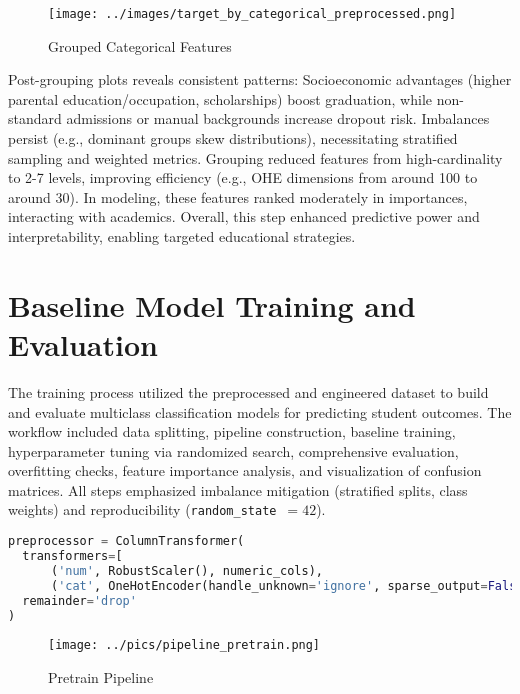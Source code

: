 \documentclass[twoside,final]{hcmut-report}
\begin{document}
\begin{figure}[H]
  \centering
  \texttt{[image: ../images/target\_by\_categorical\_preprocessed.png]}
  \caption{Grouped Categorical Features}
  \label{grouped_cat}
\end{figure}

Post-grouping plots reveals consistent patterns: Socioeconomic advantages (higher parental education/occupation, scholarships) boost graduation, while non-standard admissions or manual backgrounds increase dropout risk. Imbalances persist (e.g., dominant groups skew distributions), necessitating stratified sampling and weighted metrics. Grouping reduced features from high-cardinality to 2-7 levels, improving efficiency (e.g., OHE dimensions from around 100 to around 30). In modeling, these features ranked moderately in importances, interacting with academics. Overall, this step enhanced predictive power and interpretability, enabling targeted educational strategies.

\section{Baseline Model Training and Evaluation}
The training process utilized the preprocessed and engineered dataset to build and evaluate multiclass classification models for predicting student outcomes. The workflow included data splitting, pipeline construction, baseline training, hyperparameter tuning via randomized search, comprehensive evaluation, overfitting checks, feature importance analysis, and visualization of confusion matrices. All steps emphasized imbalance mitigation (stratified splits, class weights) and reproducibility (\texttt{random\_state}~$=42$).
\begin{lstlisting}[language=python]
preprocessor = ColumnTransformer(
  transformers=[
      ('num', RobustScaler(), numeric_cols),
      ('cat', OneHotEncoder(handle_unknown='ignore', sparse_output=False), categorical_cols)],
  remainder='drop'
)
\end{lstlisting}
\begin{figure}[H]
  \centering
  \texttt{[image: ../pics/pipeline\_pretrain.png]}
  \caption{Pretrain Pipeline}
  \label{pretrain}
\end{figure}
\end{document}
